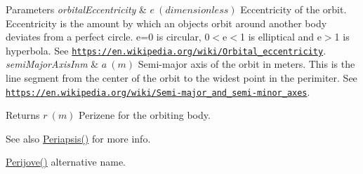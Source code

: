 \begin{DoxyParams}{Parameters}
{\em orbital\+Eccentricity} & $ e\ (dimensionless)$ Eccentricity of the orbit. Eccentricity is the amount by which an objects orbit around another body deviates from a perfect circle. e=0 is circular, 0$<$e$<$1 is elliptical and e$>$1 is hyperbola. See \href{https://en.wikipedia.org/wiki/Orbital_eccentricity}{\tt https\+://en.\+wikipedia.\+org/wiki/\+Orbital\+\_\+eccentricity}. \\
\hline
{\em semi\+Major\+Axis\+Inm} & $ a\ (m)$ Semi-\/major axis of the orbit in meters. This is the line segment from the center of the orbit to the widest point in the perimiter. See \href{https://en.wikipedia.org/wiki/Semi-major_and_semi-minor_axes}{\tt https\+://en.\+wikipedia.\+org/wiki/\+Semi-\/major\+\_\+and\+\_\+semi-\/minor\+\_\+axes}. \\
\hline
\end{DoxyParams}
\begin{DoxyReturn}{Returns}
$ r\ (m)$ Perizene for the orbiting body. 
\end{DoxyReturn}
\begin{DoxySeeAlso}{See also}
\mbox{\hyperlink{group___e_g_x_phys-_periapsis_gad487212733711bc2ce73c8137c9309c3}{Periapsis()}} for more info. 

\mbox{\hyperlink{group___e_g_x_phys-_periapsis_gae1daec11bd7b479853ba92ca6368a23c}{Perijove()}} alternative name. 
\end{DoxySeeAlso}
